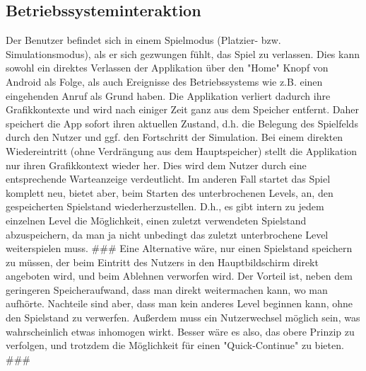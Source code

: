 \subsection{Betriebssysteminteraktion}
Der Benutzer befindet sich in einem Spielmodus (Platzier- bzw. 
Simulationsmodus), als er sich gezwungen fühlt, das Spiel zu verlassen.
Dies kann sowohl ein direktes Verlassen der Applikation über den "Home"
Knopf von Android als Folge, als auch Ereignisse des Betriebssystems wie 
z.B. einen eingehenden Anruf als Grund haben. \newline
Die Applikation verliert dadurch ihre Grafikkontexte und wird nach einiger
Zeit ganz aus dem Speicher entfernt. Daher speichert die App sofort
ihren aktuellen Zustand, d.h. die Belegung des Spielfelds durch den Nutzer 
und ggf. den Fortschritt der Simulation. \newline
Bei einem direkten Wiedereintritt (ohne Verdrängung aus dem Hauptspeicher)
stellt die Applikation nur ihren Grafikkontext wieder her. Dies wird dem
Nutzer durch eine entsprechende Warteanzeige verdeutlicht. \newline
Im anderen Fall startet das Spiel komplett neu, bietet aber, beim
Starten des unterbrochenen Levels, an, den gespeicherten Spielstand
wiederherzustellen. D.h., es gibt intern zu jedem einzelnen Level die Möglichkeit,
einen zuletzt verwendeten Spielstand abzuspeichern, da man ja nicht
unbedingt das zuletzt unterbrochene Level weiterspielen muss.
\newline
\newline
\#\#\# Eine Alternative wäre, nur einen Spielstand speichern zu müssen, der 
beim Eintritt des Nutzers in den Hauptbildschirm direkt angeboten wird,
und beim Ablehnen verworfen wird. Der Vorteil ist, neben dem geringeren
Speicheraufwand, dass man direkt weitermachen kann, wo man aufhörte.
Nachteile sind aber, dass man kein anderes Level beginnen kann, ohne den
Spielstand zu verwerfen. Außerdem muss ein Nutzerwechsel möglich sein, 
was wahrscheinlich etwas inhomogen wirkt. Besser wäre es also, das
obere Prinzip zu verfolgen, und trotzdem die Möglichkeit für einen
"Quick-Continue" zu bieten. \#\#\#
